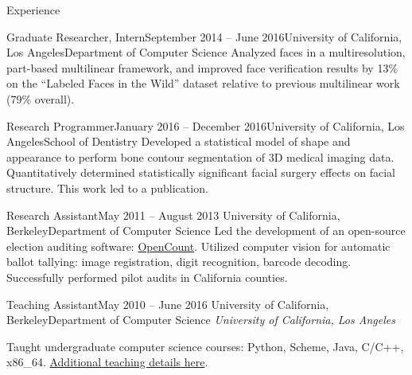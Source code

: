 \documentclass{resume}
\begin{document}
\begin{component}{Experience}
\begin{position}{Graduate Researcher, Intern}{September 2014 -- June 2016}{University of California, Los Angeles}{Department of Computer Science}
    {Analyzed faces in a multiresolution, part-based multilinear framework, and improved face verification results by 13\% on the ``Labeled Faces in the Wild'' dataset relative to previous multilinear work (79\% overall).
}
	\end{position}

\vspace{-0.25em}

    \begin{position}{Research Programmer}{January 2016 -- December 2016}{University of California, Los Angeles}{School of Dentistry}
{
Developed a statistical model of shape and appearance to perform bone contour segmentation of 3D medical imaging data.
\\
Quantitatively determined statistically significant facial surgery effects on facial structure.
This work led to a publication.
}
      \end{position}

\vspace{-0.75em}

	\begin{position}{Research Assistant}{May 2011 -- August 2013}
	 	{University of California, Berkeley}{Department of Computer Science}
	{Led the development of an open-source election auditing software: \href{https://github.com/FreeAndFair/OpenCount}{OpenCount}.
     Utilized computer vision for automatic ballot tallying: image registration, digit recognition, barcode decoding.
     Successfully performed
         pilot audits in California counties.
}
	\end{position}

\vspace{-0.25em}

	\begin{position}{Teaching Assistant}{May 2010 -- June 2016}
		{University of California, Berkeley}{Department of Computer Science}
    \emph{University of California, Los Angeles}

	{Taught undergraduate computer science courses: Python, Scheme, Java, C/C++, x86\_64.
      \href{http://eric-kim.net/eric-kim-net/teaching.html}{Additional teaching details here}.
    }
	\end{position}
\end{component}
\end{document}
